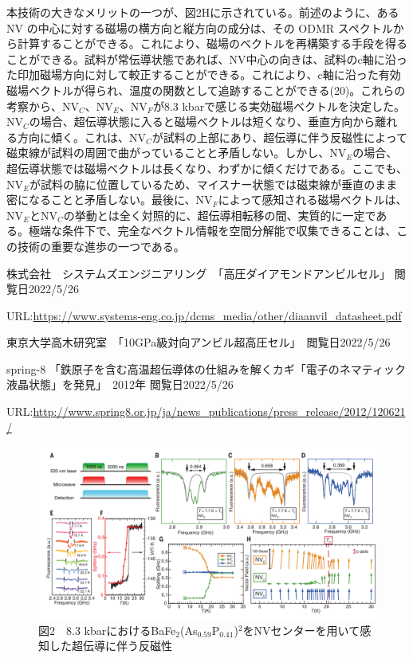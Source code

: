 \documentclass[dvipdfmx]{jsarticle}
\begin{document}
本技術の大きなメリットの一つが、図2Hに示されている。前述のように、ある NV の中心に対する磁場の横方向と縦方向の成分は、その ODMR スペクトルから計算することができる。これにより、磁場のベクトルを再構築する手段を得ることができる。試料が常伝導状態であれば、NV中心の向きは、試料のc軸に沿った印加磁場方向に対して較正することができる。これにより、c軸に沿った有効磁場ベクトルが得られ、温度の関数として追跡することができる(20)。これらの考察から、NV$_C$、NV$_E$、NV$_F$が8.3 kbarで感じる実効磁場ベクトルを決定した。NV$_C$の場合、超伝導状態に入ると磁場ベクトルは短くなり、垂直方向から離れる方向に傾く。これは、NV$_C$が試料の上部にあり、超伝導に伴う反磁性によって磁束線が試料の周囲で曲がっていることと矛盾しない。しかし、NV$_E$の場合、超伝導状態では磁場ベクトルは長くなり、わずかに傾くだけである。ここでも、NV$_E$が試料の脇に位置しているため、マイスナー状態では磁束線が垂直のまま密になることと矛盾しない。最後に、NV$_F$によって感知される磁場ベクトルは、NV$_E$とNV$_C$の挙動とは全く対照的に、超伝導相転移の間、実質的に一定である。極端な条件下で、完全なベクトル情報を空間分解能で収集できることは、この技術の重要な進歩の一つである。　

\begin{thebibliography}{9}
\item 株式会社　システムズエンジニアリング　「高圧ダイアモンドアンビルセル」 閲覧日2022/5/26

URL:\url{https://www.systems-eng.co.jp/dcms_media/other/diaanvil_datasheet.pdf}

\item 東京大学高木研究室　「10GPa級対向アンビル超高圧セル」　閲覧日2022/5/26

\item spring-8 「鉄原子を含む高温超伝導体の仕組みを解くカギ「電子のネマティック液晶状態」を発見」　2012年 
閲覧日2022/5/26

URL:\url{http://www.spring8.or.jp/ja/news_publications/press_release/2012/120621/}
  
\end{thebibliography}


\newpage

\begin{figure}[h]
\centering
\includegraphics[width=16cm]{Fig.2.png}
\caption{図2　8.3 kbarにおけるBaFe$_2$(As$_{0.59}$P$_{0.41}$)$^2$をNVセンターを用いて感知した超伝導に伴う反磁性}
\end{figure}%
\end{document}
